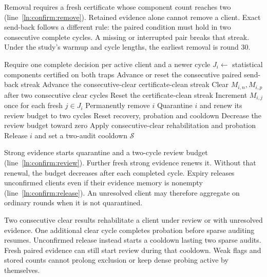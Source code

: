 \documentclass[conference]{IEEEtran}
\begin{document}
Removal requires a fresh certificate whose component count reaches two
(line~\ref{ln:confirm:remove}). Retained evidence alone cannot remove a
client. Exact send-back follows a different rule: the paired condition
must hold in two consecutive complete cycles. A missing or interrupted
pair breaks that streak. Under the study's warmup and cycle lengths, the
earliest removal is round 30.

\begin{algorithm}[!htb]
\caption{Phase III: confirm evidence and bound review}\label{alg:confirmation}
\begin{algorithmic}[1]\small
{}
 \State Require one complete decision per active client and a newer cycle
  \State $J_i\gets$ statistical components certified on both traps
  \State Advance or reset the consecutive paired send-back streak
   \State Advance the consecutive-clear certificate-clean streak
   \State Clear $M_{i,n},M_{i,p}$ after two consecutive clear cycles
  \Else
   \State Reset the certificate-clean streak
   \State Increment $M_{i,j}$ once for each fresh $j\in J_i$\label{ln:confirm:increment}
  \EndIf
   \State Permanently remove $i$\label{ln:confirm:remove}
   \State Quarantine $i$ and renew its review budget to two cycles\label{ln:confirm:review}
   \State Reset recovery, probation and cooldown
  \Else
   \State Decrease the review budget toward zero
   \State Apply consecutive-clear rehabilitation and probation
    \State Release $i$ and set a two-audit cooldown\label{ln:confirm:release}
   \EndIf
  \EndIf
 \EndFor
 \State \Return $\mathcal S$
\EndProcedure
\end{algorithmic}
\end{algorithm}

Strong evidence starts quarantine and a two-cycle review budget
(line~\ref{ln:confirm:review}). Further fresh strong evidence renews it.
Without that renewal, the budget decreases after each completed cycle.
Expiry releases unconfirmed clients even if their evidence memory is
nonempty (line~\ref{ln:confirm:release}). An unresolved client may
therefore aggregate on ordinary rounds when it is not quarantined.

Two consecutive clear results rehabilitate a client under review or with
unresolved evidence. One additional clear cycle completes probation before sparse
auditing resumes. Unconfirmed release instead starts a cooldown lasting
two sparse audits. Fresh paired evidence can still start review during
that cooldown. Weak flags and stored counts cannot prolong exclusion
or keep dense probing active by themselves.
\end{document}
